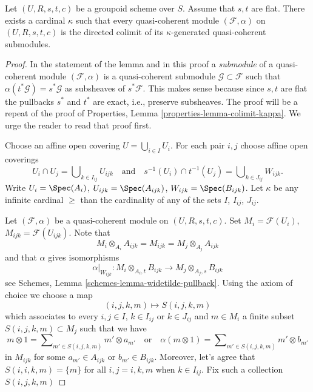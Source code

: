 \begin{lemma}
\label{lemma-colimit-kappa}
Let $(U, R, s, t, c)$ be a groupoid scheme over $S$.
Assume that $s, t$ are flat. There exists a
cardinal $\kappa$ such that every quasi-coherent module
$(\mathcal{F}, \alpha)$ on $(U, R, s, t, c)$
is the directed colimit of its $\kappa$-generated
quasi-coherent submodules.
\end{lemma}

\begin{proof}
In the statement of the lemma and in this proof
a {\it submodule} of a quasi-coherent module $(\mathcal{F}, \alpha)$
is a quasi-coherent submodule $\mathcal{G} \subset \mathcal{F}$
such that $\alpha(t^*\mathcal{G}) = s^*\mathcal{G}$ as subsheaves of
$s^*\mathcal{F}$. This makes sense because since $s, t$ are flat the
pullbacks $s^*$ and $t^*$ are exact, i.e., preserve subsheaves.
The proof will be a repeat of the proof of
Properties, Lemma \ref{properties-lemma-colimit-kappa}.
We urge the reader to read that proof first.

\medskip\noindent
Choose an affine open covering $U = \bigcup_{i \in I} U_i$.
For each pair $i, j$ choose affine open coverings
$$
U_i \cap U_j = \bigcup\nolimits_{k \in I_{ij}} U_{ijk}
\quad\text{and}\quad
s^{-1}(U_i) \cap t^{-1}(U_j) = \bigcup\nolimits_{k \in J_{ij}} W_{ijk}.
$$
Write $U_i = \Spec(A_i)$, $U_{ijk} = \Spec(A_{ijk})$,
$W_{ijk} = \Spec(B_{ijk})$.
Let $\kappa$ be any infinite cardinal $\geq$ than the cardinality
of any of the sets $I$, $I_{ij}$, $J_{ij}$.

\medskip\noindent
Let $(\mathcal{F}, \alpha)$ be a quasi-coherent module on $(U, R, s, t, c)$.
Set $M_i = \mathcal{F}(U_i)$, $M_{ijk} = \mathcal{F}(U_{ijk})$.
Note that
$$
M_i \otimes_{A_i} A_{ijk} = M_{ijk} = M_j \otimes_{A_j} A_{ijk}
$$
and that $\alpha$ gives isomorphisms
$$
\alpha|_{W_{ijk}} :
M_i \otimes_{A_i, t} B_{ijk}
\longrightarrow
M_j \otimes_{A_j, s} B_{ijk}
$$
see
Schemes, Lemma \ref{schemes-lemma-widetilde-pullback}.
Using the axiom of choice we choose a map
$$
(i, j, k, m) \mapsto S(i, j, k, m)
$$
which associates to every $i, j \in I$, $k \in I_{ij}$ or $k \in J_{ij}$
and $m \in M_i$ a finite subset $S(i, j, k, m) \subset M_j$
such that we have
$$
m \otimes 1 = \sum\nolimits_{m' \in S(i, j, k, m)} m' \otimes a_{m'}
\quad\text{or}\quad
\alpha(m \otimes 1) = \sum\nolimits_{m' \in S(i, j, k, m)} m' \otimes b_{m'}
$$
in $M_{ijk}$ for some $a_{m'} \in A_{ijk}$ or $b_{m'} \in B_{ijk}$.
Moreover, let's agree that $S(i, i, k, m) = \{m\}$ for all
$i, j = i, k, m$ when $k \in I_{ij}$. Fix such a collection $S(i, j, k, m)$


\end{proof}
